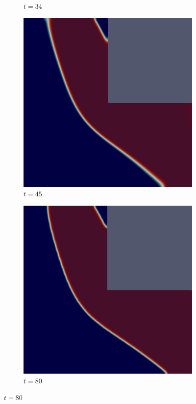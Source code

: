 \begin{figure}[H]
\begin{subfigure}{.4\textwidth}
        \caption{$t = 34$}
    \end{subfigure}
    \begin{subfigure}{.4\textwidth}
        \includegraphics[width=\textwidth]{imgs/LShapeSource/seventh.png}
        \caption{$t = 45$}
    \end{subfigure}
    \begin{subfigure}{.4\textwidth}
        \includegraphics[width=\textwidth]{imgs/LShapeSource/eighth.png}
        \caption{$t = 80$}
    \end{subfigure}
\end{figure}

